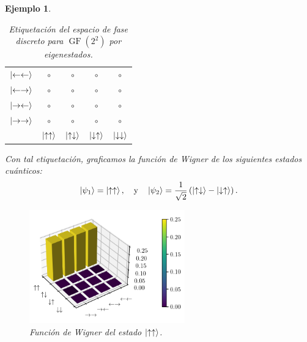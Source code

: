 \documentclass[a4paper]{report}
\DeclareMathOperator{\GF}{GF}
\newtheorem{example}{Ejemplo}
\begin{document}
\begin{example}
    \begin{table}[!ht]
      \centering
      \begin{tabular}{c c c c c}
        $\ket{\leftarrow\leftarrow}$ & $\circ$ & $\circ$ &
        $\circ$ & $\circ$ \\[7pt]
        $\ket{\leftarrow\rightarrow}$ & $\circ$ & $\circ$ &
        $\circ$ & $\circ$ \\[7pt]
        $\ket{\rightarrow\leftarrow}$ & $\circ$ & $\circ$ &
        $\circ$ & $\circ$ \\[7pt]
        $\ket{\rightarrow\rightarrow}$ & $\circ$ & $\circ$ &
        $\circ$ & $\circ$ \\[7pt]
        & $\ket{\uparrow\uparrow}$ &
        $\ket{\uparrow\downarrow}$
        & $\ket{\downarrow\uparrow}$ &
        $\ket{\downarrow\downarrow}$
      \end{tabular}
      \caption{Etiquetación del espacio de fase discreto
      para $\GF(2^2)$ por eigenestados.}
      \label{tab:state_phase_space}
    \end{table}

    Con tal etiquetación, graficamos la función de Wigner de
    los siguientes estados cuánticos:
    \[
      \ket{\psi_1}
      = \ket{\uparrow\uparrow},
      \quad
      \text{y}
      \quad
      \ket{\psi_2}
      = \frac{1}{\sqrt{2}} \left( \ket{\uparrow\downarrow} -
      \ket{\downarrow\uparrow} \right). 
    \]
    
    \begin{figure}[ht]
      \centering
      \includegraphics[width=0.6\textwidth]{imgs/wigner-desargues-2-2-s1.png}
      \caption{Función de Wigner del estado
        $\ket{\uparrow\uparrow}$.}
      \label{fig:wigner-desargues-2-2-s1}
    \end{figure}


\end{example}
\end{document}
